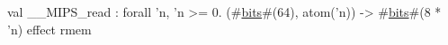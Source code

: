val __MIPS_read : forall 'n, 'n >= 0. (#\hyperref[zbits]{bits}#(64), atom('n)) -> #\hyperref[zbits]{bits}#(8 * 'n) effect {rmem}
